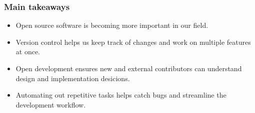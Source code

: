 \begin{frame}
    \frametitle{Main takeaways}
    \begin{itemize}
    \item Open source software is becoming more important in our field. 
    \pause
    \item Version control helps us keep track of changes and work on multiple features at once.
    \pause
    \item Open development ensures new and external contributors can understand design and implementation desicions.
    \pause
    \item Automating out repetitive tasks helps catch bugs and streamline the development workflow. 
    \end{itemize}
\end{frame}
